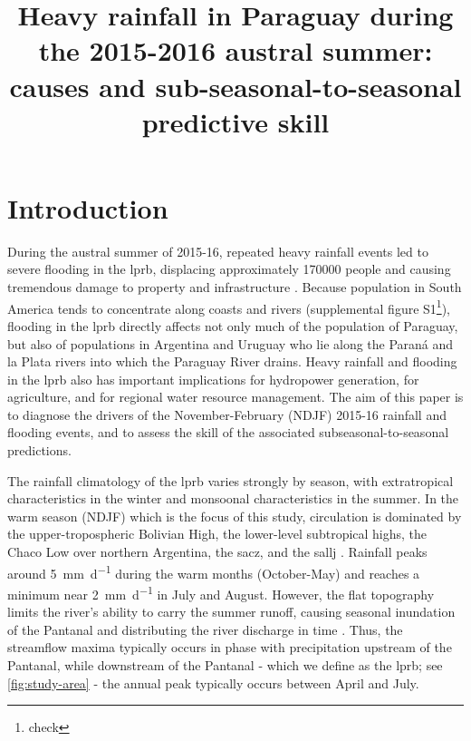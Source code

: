 \documentclass[twocol]{ametsoc}
\title{Heavy rainfall in Paraguay during the 2015-2016 austral summer: causes and sub-seasonal-to-seasonal predictive skill}
\affiliation{Columbia Water Center. Dept. of Earth and Environmental Engineering, Columbia University, 500 W. 120th St., New York, NY. USA \\ Columbia Water Center, Columbia University, 500 W. 120th St., New York, NY. USA}
\begin{document}
\maketitle

\section{Introduction}

During the austral summer of 2015-16, repeated heavy rainfall events led to severe flooding in the \gls{lprb}, displacing approximately \num{170000} people \citep{Brakenridge2016} and causing tremendous damage to property and infrastructure \citep{MinisteriodeObrasPublicasyComunicacion2016}.
Because population in South America tends to concentrate along coasts and rivers (supplemental figure S1\footnote{check}), flooding in the \gls{lprb} directly affects not only much of the population of Paraguay, but also of populations in Argentina and Uruguay who lie along the Paran\'{a} and la Plata rivers into which the Paraguay River drains.
Heavy rainfall and flooding in the \gls{lprb} also has important implications for hydropower generation, for agriculture, and for regional water resource management.
The aim of this paper is to diagnose the drivers of the November-February (NDJF) 2015-16 rainfall and flooding events, and to assess the skill of the associated subseasonal-to-seasonal predictions.

The rainfall climatology of the \gls{lprb} varies strongly by season, with extratropical characteristics in the winter and monsoonal characteristics in the summer.
In the warm season (NDJF) which is the focus of this study, circulation is dominated by the upper-tropospheric Bolivian High, the lower-level subtropical highs, the Chaco Low over northern Argentina, the \gls{sacz}, and the \gls{sallj} \citep{Grimm2009,Marengo2012}.
Rainfall peaks around \SI{5}{\milli\meter\per\day} during the warm months (October-May) and reaches a minimum near \SI{2}{\milli\meter\per\day} in July and August.
However, the flat topography limits the river's ability to carry the summer runoff, causing seasonal inundation of the Pantanal and distributing the river discharge in time \citep{Bravo2011,Barros2004}.
Thus, the streamflow maxima typically occurs in phase with precipitation upstream of the Pantanal, while downstream of the Pantanal - which we define as the \acrlong{lprb}; see \cref{fig:study-area} - the annual peak typically occurs between April and July.
\end{document}
